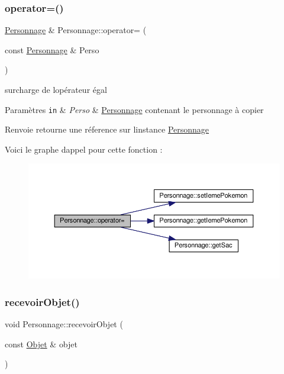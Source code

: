 \subsubsection{\texorpdfstring{operator=()}{operator=()}}
{\footnotesize\ttfamily \hyperlink{class_personnage}{Personnage} \& Personnage\+::operator= (\begin{DoxyParamCaption}\item[{const \hyperlink{class_personnage}{Personnage} \&}]{Perso }\end{DoxyParamCaption})}



surcharge de l\textquotesingle{}opérateur égal 


\begin{DoxyParams}[1]{Paramètres}
\mbox{\tt in}  & {\em Perso} & \hyperlink{class_personnage}{Personnage} contenant le personnage à copier \\
\hline
\end{DoxyParams}
\begin{DoxyReturn}{Renvoie}
retourne une réference sur l\textquotesingle{}instance \hyperlink{class_personnage}{Personnage} 
\end{DoxyReturn}
Voici le graphe d\textquotesingle{}appel pour cette fonction \+:\nopagebreak
\begin{figure}[H]
\begin{center}
\leavevmode
\includegraphics[width=350pt]{class_personnage_a6727627eb37382d3d8f12514551df9bd_cgraph}
\end{center}
\end{figure}
\mbox{\label{class_personnage_a70fb0f0180dd625cf96dfc469ae5710e}} 
\subsubsection{\texorpdfstring{recevoir\+Objet()}{recevoirObjet()}}
{\footnotesize\ttfamily void Personnage\+::recevoir\+Objet (\begin{DoxyParamCaption}\item[{const \hyperlink{class_objet}{Objet} \&}]{objet }\end{DoxyParamCaption})}



